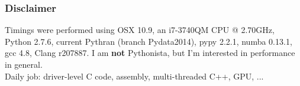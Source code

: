 \documentclass[aspectratio=1610]{beamer}
\begin{document}
\begin{frame}[fragile]
    \frametitle{Disclaimer}

Timings were performed using OSX 10.9, an i7-3740QM CPU @ 2.70GHz, Python 2.7.6, current Pythran (branch Pydata2014), pypy 2.2.1, numba 0.13.1, gcc 4.8, Clang r207887.
\vfill
I am \textbf{not} Pythonista, but I'm interested in performance in general. 
\\ Daily job: driver-level C code, assembly, multi-threaded C++, GPU, ...
\vfill
{}
\vfill
{}
\end{frame}
\end{document}

